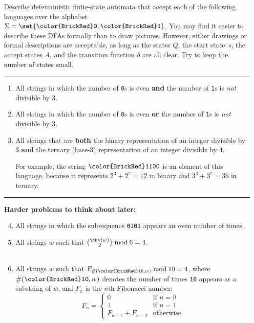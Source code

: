 \documentclass[11pt]{article}
\def\Sym#1{\texttt{\color{BrickRed}#1}}
\begin{document}

\noindent
Describe deterministic finite-state automata that accept each of the following
languages over the alphabet $\Sigma = \set{\Sym0,\Sym1}$.  You may find it
easier to describe these DFAs formally than to draw pictures.  However, either
drawings or formal descriptions are acceptable, as long as the states $Q$, the
start state~$s$, the accept states $A$, and the transition function $\delta$ are
all clear.  Try to keep the number of states small.

\bigskip\hrule\bigskip
\begin{enumerate}
\parindent 1.5em

\item
All strings in which the number of \Sym0s is even \textbf{and} the number of \Sym1s is \emph{not} divisible by $3$.

\item
All strings in which the number of \Sym0s is even \textbf{or} the number of \Sym1s is \emph{not} divisible by $3$.

\item
All strings that are \textbf{both} the binary representation of an integer divisible by $3$ \textbf{and} the ternary (base-3) representation of an integer divisible by $4$.

For example, the string $\Sym{1100}$ is an element of this language, because it represents $2^3+2^2 = 12$ in binary and $3^3+3^2 = 36$ in ternary.

\end{enumerate}

\bigskip\hrule\bigskip
\noindent
\textbf{Harder problems to think about later:}

\begin{enumerate}
\setcounter{enumi}{3}
\item
All strings in which the subsequence \Sym{0101} appears an even number of times.

\item
All strings $w$ such that $\binom{\abs{w}}{2} \bmod 6 = 4$.
\\
\\

\Hard
\item
All strings $w$ such that $F_{\#(\Sym{10}, w)} \bmod 10 = 4$, where $\#(\Sym{10}, w)$ denotes the number of times \Sym{10} appears as a substring of $w$, and $F_n$ is the $n$th Fibonacci number:
\[
	F_n = \begin{cases}
		0 & \text{if $n=0$}\\
		1 & \text{if $n=1$}\\
		F_{n-1} + F_{n-2} & \text{otherwise}
	\end{cases}
\]

\end{enumerate}
\end{document}
